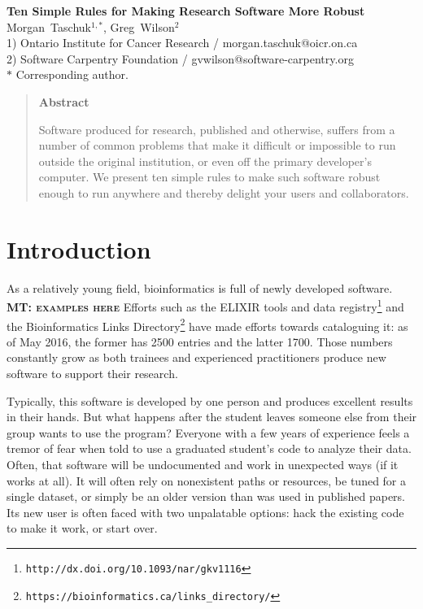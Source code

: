 \documentclass[10pt]{article}
\date{}
\newcommand{\fixme}[2]{\textsc{\textbf{{#1}: {#2}}}}
\newcommand{\withurl}[2]{{#1}\footnote{\texttt{#2}}}
\begin{document}
\begin{flushleft}
{\large\textbf{Ten Simple Rules for Making Research Software More Robust}}
\\
{Morgan~Taschuk}$^{1,\ast}$,
{Greg~Wilson}$^{2}$
\\
1) Ontario Institute for Cancer Research / morgan.taschuk@oicr.on.ca
\\
2) Software Carpentry Foundation / gvwilson@software-carpentry.org
\\
$\ast$ Corresponding author.
\end{flushleft}


\begin{quote}
\begin{center}\textbf{Abstract}\end{center}
Software produced for research,
published and otherwise,
suffers from a number of common problems
that make it difficult or impossible to run outside the original institution,
or even off the primary developer's computer.
We present ten simple rules to make such software robust enough to run anywhere
and thereby delight your users and collaborators.
\end{quote}

\section*{Introduction}

As a relatively young field, bioinformatics is full of newly developed software.
\fixme{MT}{examples here}
Efforts such as
\withurl{the ELIXIR tools and data registry}{http://dx.doi.org/10.1093/nar/gkv1116}
and the
\withurl{Bioinformatics Links Directory}{https://bioinformatics.ca/links\_directory/}
\cite{brazas2012}
have made efforts towards cataloguing it: as of May 2016, the former
has 2500 entries and the latter 1700. Those numbers constantly
grow as both trainees and experienced practitioners produce new
software to support their research.

Typically, this software is developed by one person and 
produces excellent results in their hands. But what happens after the
student leaves someone else from their group wants to use the program? Everyone with
a few years of experience feels a tremor of fear when told to use
a graduated student's code to analyze their data.
Often, that software will be undocumented and work in unexpected
ways (if it works at all).  It will often rely on nonexistent paths or resources,
be tuned for a single dataset,
or simply be an older version than was used in published papers.
Its new user is often faced with two unpalatable options:
hack the existing code to make it work, or start over.
\end{document}
